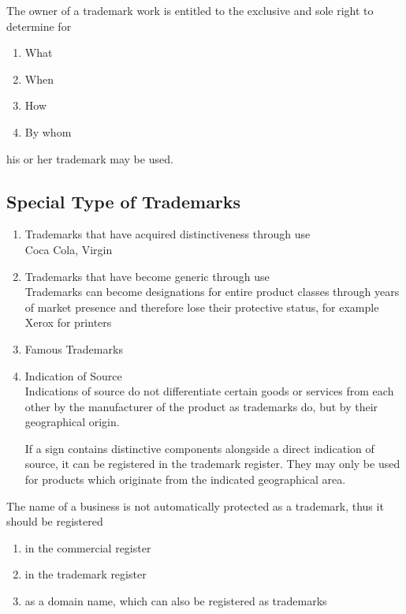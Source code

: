 \documentclass[11pt]{article}
\theoremstyle{definition}
\begin{document}
The owner of a trademark work is entitled to the exclusive and sole right to determine for
\begin{enumerate}
	\item What
	\item When
	\item How
	\item By whom
\end{enumerate}
his or her trademark may be used.

\subsection{Special Type of Trademarks}
\begin{enumerate}
	\item Trademarks that have acquired distinctiveness through use\\
	Coca Cola, Virgin
	\item Trademarks that have become generic through use\\
	Trademarks can become designations for entire product classes through years of market presence and therefore lose their protective status, for example Xerox for printers
	\item Famous Trademarks
	\item Indication of Source\\
	Indications of source do not differentiate certain goods or services from each other by the manufacturer of the product as trademarks do, but by their geographical origin.
	
	If a sign contains distinctive components alongside a direct indication of source, it can be registered in the trademark register. They may only be used for products which originate from the indicated geographical area.
\end{enumerate}
The name of a business is not automatically protected as a trademark, thus it should be registered
\begin{enumerate}
	\item in the commercial register
	\item in the trademark register
	\item as a domain name, which can also be registered as trademarks
\end{enumerate}
\end{document}
